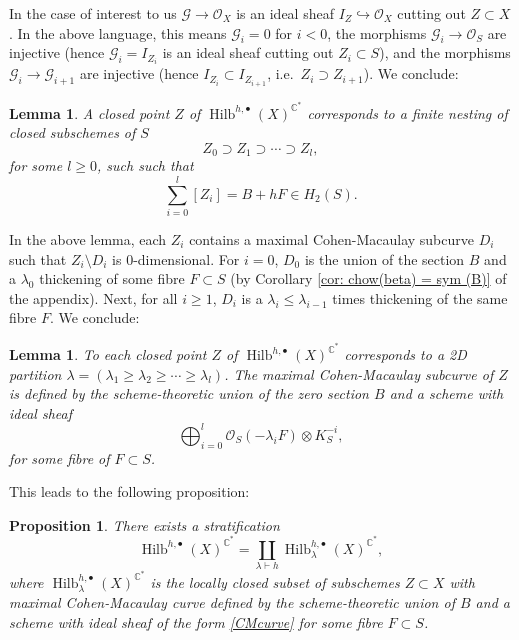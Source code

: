 \documentclass{amsart}
\newtheorem{proposition}[theorem]{Proposition}
\newtheorem{lemma}[theorem]{Lemma}
\theoremstyle{definition}
\newcommand{\CC} {\mathbb{C}}          %
\renewcommand{\O}{\mathcal{O}}
\newcommand{\Hilb}{\operatorname{Hilb}}
\newcommand{\G}{\mathcal{G}}
\begin{document}
In the case of interest to us $\G \rightarrow \O_X$ is an ideal sheaf $I_Z \hookrightarrow \O_X$ cutting out $Z \subset X$. In the above language, this means $\G_i = 0$ for $i<0$, the morphisms $\G_i \rightarrow \O_S$ are injective (hence $\G_i = I_{Z_i}$ is an ideal sheaf cutting out $Z_i \subset S$), and the morphisms $\G_i \rightarrow \G_{i+1}$ are injective (hence $I_{Z_i} \subset I_{Z_{i+1}}$, i.e.~$Z_{i} \supset Z_{i+1}$). We conclude:
\begin{lemma}
A closed point $Z$ of $\Hilb^{h,\bullet}(X)^{\CC^*}$ corresponds to a finite nesting of closed subschemes of $S$
$$
Z_{0} \supset Z_{1} \supset \cdots \supset Z_{l},
$$
for some $l \geq 0$, such such that
$$
\sum_{i=0}^{l} [Z_i] = B + hF \in H_2(S).
$$
\end{lemma}

In the above lemma, each $Z_i$ contains a maximal Cohen-Macaulay subcurve $D_i$ such that $Z_i \setminus D_i$ is 0-dimensional. For $i=0$, $D_0$ is the union of the section $B$ and a $\lambda_0$ thickening of some fibre $F \subset S$ (by Corollary \ref{cor: chow(beta) = sym (B)} of the appendix). Next, for all $i \geq 1$, $D_i$ is a $\lambda_i \leq \lambda_{i-1}$ times thickening of the same fibre $F$. We conclude:
\begin{lemma}
To each closed point $Z$ of $\Hilb^{h,\bullet}(X)^{\CC^*}$ corresponds to a 2D partition $\lambda = (\lambda_1 \geq \lambda_2 \geq \cdots \geq \lambda_l)$. The maximal Cohen-Macaulay subcurve of $Z$ is defined by the scheme-theoretic union of the zero section $B$ and a scheme with ideal sheaf
\begin{equation} \label{CMcurve}
\bigoplus_{i=0}^{l} \O_{S}(-\lambda_i F) \otimes K_{S}^{-i},
\end{equation}
for some fibre of $F \subset S$.
\end{lemma}
This leads to the following proposition:
\begin{proposition}
There exists a stratification
$$
\Hilb^{h,\bullet}(X)^{\CC^*} = \coprod_{\lambda \vdash h} \Hilb^{h,\bullet}_{\lambda}(X)^{\CC^*},
$$
where $\Hilb^{h,\bullet}_{\lambda}(X)^{\CC^*}$ is the locally closed subset of subschemes $Z \subset X$ with maximal Cohen-Macaulay curve defined by the scheme-theoretic union of $B$ and a scheme with ideal sheaf of the form \eqref{CMcurve} for some fibre $F \subset S$.
\end{proposition}
\end{document}
